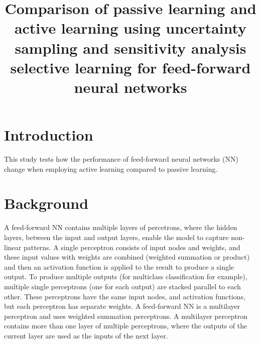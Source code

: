 \documentclass[conference]{IEEEtran}
\begin{document}
	
	\title{Comparison of passive learning and active learning using uncertainty sampling and sensitivity analysis selective learning for feed-forward neural networks}
	
	\author{
	}
	
	\maketitle
	
	\begin{abstract}
		
	\end{abstract}
	
	\section{Introduction}
	This study tests how the performance of feed-forward neural networks (NN) change when employing active learning compared to passive learning.
	
	\section{Background}
	A feed-forward NN contains multiple layers of percetrons, where the hidden layers, between the input and output layers, enable the model to capture non-linear patterns. A single perceptron consists of input nodes and weights, and these input values with weights are combined (weighted summation or product) and then an activation function is applied to the result to produce a single output. To produce multiple outputs (for multiclass classification for example), multiple single perceptrons (one for each output) are stacked parallel to each other. These perceptrons have the same input nodes, and activation functions, but each perceptron has separate weights. A feed-forward NN is a multilayer perceptron and uses weighted summation perceptrons. A multilayer perceptron contains more than one layer of multiple perceptrons, where the outputs of the current layer are used as the inputs of the next layer.
	
\end{document}
